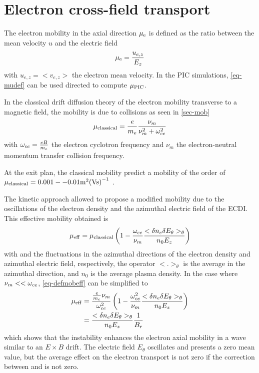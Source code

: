 
\section{Electron cross-field transport}
  \label{sec-transport}
  
  The electron mobility in the axial direction $\mu_{\mathrm{e}}$ is defined as the ratio between the mean velocity $u$ and the electric field
  \begin{equation} \label{eq-mudef}
    \mu_{\mathrm{e}} = \frac{u_{e,z}}{E_z}
  \end{equation}
  with $u_{e,z}=<v_{e,z}>$ the electron mean velocity.
  In the \ac{PIC} simulations, \cref{eq-mudef} can be used directed to compute $\mu_{\mathrm{PIC}}$.
  
  In the classical drift diffusion theory of the electron mobility transverse to a magnetic field, the mobility is due to collisions as seen in \vref{sec-mob} 
  \begin{equation} \label{eq-mobclas}
    \mu_{\mathrm{classical}} = \frac{e}{m_e} \frac{\nu_m}{\nu_m^2 + \omega_{ce}^2}
  \end{equation}
  with $\omega_{ce}=\frac{e B}{m_e}$ the electron cyclotron frequency and $\nu_m$ the electron-neutral momentum transfer collision frequency.
  
  At the exit plan, the classical mobility predict a mobility of the order of $\mu_{\mathrm{classical}}=0.001--0.01 \text{m}^2\text{(Vs)}^{-1}$ \citep{adam2008a}.
  
  The kinetic approach allowed \citet{lafleur2016a} to propose a modified mobility due to the oscillations of the electron density and the azimuthal electric field of the \ac{ECDI}.
  This effective mobility obtained is 
  \begin{equation} \label{eq-defmobeff}
    \mu_{\mathrm{eff}} = \mu_{\mathrm{classical}} \left( 1 - \frac{\omega_{ce}}{\nu_m}  \frac{< \delta n_e \delta E_{\theta} >_{\theta} }{n_0 E_z}   \right)
  \end{equation}
  with \dne{} and \dEt{} the fluctuations in the azimuthal directions of the electron density and azimuthal electric field, respectively, the operator $< . >_{\theta}$ is the average in the azimuthal direction, and $n_0$ is the average plasma density.
  In the case where $\nu_m << \omega_{ce}$, \cref{eq-defmobeff} can be simplified to 
  \begin{align} 
    \mu_{\mathrm{eff}} &= \frac{\frac{e}{m_e} \nu_m}{\omega_{ce}^2} \left( 1 - \frac{\omega_{ce}^2}{\nu_m}  \frac{< \delta n_e \delta E_{\theta} >_{\theta} }{n_0 E_z}   \right) \nonumber \\
    &= \frac{< \delta n_e \delta E_{\theta} >_{\theta} }{n_0 E_z}   \frac{1}{B_r} \label{eq-mobeffsimple}
  \end{align}
  which shows that the instability enhances the electron axial mobility in a wave similar to an $E \times B$ drift.
  The electric field $E_{\theta}$ oscillates and presents a zero mean value, but the average effect on the electron transport is not zero if the correction between \dEt{} and \dne{} is not zero.
  
